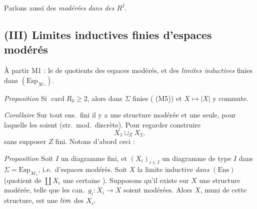 \documentclass[11pt,a4paper]{article}
\begin{document}
Parlons aussi des  \ill{} \ill{} \emph{modérées}
 \ill{} \emph{dans des $R^I$}.

\subsection*{(III) Limites inductives finies d'espaces modérés}
À partir \ill{} \ill{} \ill{} M1 \ill{} \ill{} \ill{} \ill{} \ill{}
 : le  de quotients des espaces
modérés, et des \emph{limites inductives} finies dans $(\mathrm{Esp}_{\mathcal{M}_*})$.

\emph{Proposition} Si  $\operatorname{card} R_0
\geqslant 2$,  alors
dans $\Sigma$  
 finies ( (M5)) et $X \mapsto
|X|$ y commute.

\emph{Corollaire} Sur tout ens.\ fini il y a une structure modérée et une
seule, pour laquelle les   soient
\ill{} (str.\ mod.\ discrète).
Pour  regarder \ill{} \ill{} \ill{} \ill{} construire
\[ X_1 \sqcup_Z X_2 , \]
sans supposer $Z$ fini. Notons d'abord ceci :

\emph{Proposition} Soit $I$ un  diagramme fini, et
$(X_i)_{i \in I}$ un diagramme de type $I$ dans $\Sigma =
\mathrm{Esp}_{\mathcal{M}_*}$, i.e.\ d'espaces modérés. Soit $X$ la limite
inductive \emph{dans} $(\mathrm{Ens})$ (quotient de $\coprod X_i$  une
certaine ). Supposons qu'il existe sur $X$ une structure
modérée, telle que les  can.\ $g_i : X_i \to X$
soient modérées. Alors $X$, muni de cette structure, est une $\varinjlim$ des
$X_i$.
\end{document}
